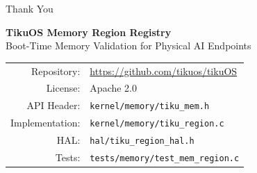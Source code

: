 \documentclass[aspectratio=169, 10pt]{beamer}
\begin{document}
\begin{frame}{Thank You}
\begin{center}
\Large\textbf{TikuOS Memory Region Registry}\\[0.5em]
\normalsize Boot-Time Memory Validation for Physical AI Endpoints\\[1.5em]

\begin{tabular}{rl}
  Repository: & \url{https://github.com/tikuos/tikuOS} \\
  License:    & Apache 2.0 \\
  API Header: & \texttt{kernel/memory/tiku\_mem.h} \\
  Implementation: & \texttt{kernel/memory/tiku\_region.c} \\
  HAL:        & \texttt{hal/tiku\_region\_hal.h} \\
  Tests:      & \texttt{tests/memory/test\_mem\_region.c} \\
\end{tabular}
\end{center}
\end{frame}
\end{document}

